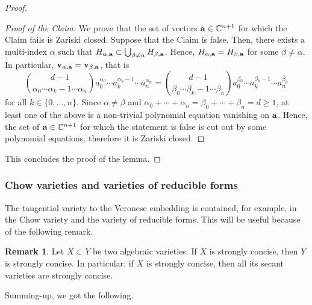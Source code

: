 \documentclass{amsart}
\theoremstyle{plain}
\numberwithin{theorem}{section}
\theoremstyle{definition}
\newtheorem{remark}[theorem]{Remark}
\newcommand{\bbC}{\mathbb{C}}
\begin{document}
\begin{proof}
\begin{proof}[Proof of the Claim]
        We prove that the set of vectors ${\bf a} \in \bbC^{n+1}$ for which the Claim fails is Zariski closed. Suppose that the Claim is false. Then, there exists a multi-index $\alpha$ such that $H_{\alpha,{\bf a}} \subset \bigcup_{\beta \neq \alpha} H_{\beta, {\bf a}}$. Hence, $H_{\alpha,{\bf a}} = H_{\beta,{\bf a}}$ for some $\beta \neq \alpha$. In particular, ${\bf v}_{\alpha,{\bf a}} = {\bf v}_{\beta,{\bf a}}$, that is
        \[
            \binom{d-1}{\alpha_0 \cdots \alpha_{k} -1 \cdots \alpha_n}a_0^{\alpha_0} \cdots a_k^{\alpha_k -1} \cdots a_n^{\alpha_n} = \binom{d-1}{\beta_0 \cdots \beta_{k} -1 \cdots \beta_n}a_0^{\beta_0} \cdots a_k^{\beta_k -1} \cdots a_n^{\beta_n}
        \]
        for all $k \in \{0,\ldots,n\}$. Since $\alpha \neq \beta$ and $\alpha_0 + \cdots + \alpha_n = \beta_0 + \cdots + \beta_n = d \geq 1$, at least one of the above is a non-trivial polynomial equation vanishing on ${\bf a}$. Hence, the set of ${\bf a} \in \bbC^{n+1}$ for which the statement is false is cut out by some polynomial equations, therefore it is Zariski closed.
    \end{proof}
    This concludes the proof of the lemma.
\end{proof}

\subsubsection{Chow varieties and varieties of reducible forms}

The tangential variety to the Veronese embedding is contained, for example, in the Chow variety and the variety of reducible forms. This will be useful because of the following remark.

\begin{remark}
\label{rmk:containment}
    Let $X \subset Y$ be two algebraic varieties. If $X$ is strongly concise, then $Y$ is strongly concise. In particular, if $X$ is strongly concise, then all its secant varieties are strongly concise.
\end{remark}

Summing-up, we got the following. 
\end{document}
